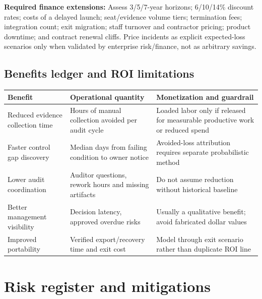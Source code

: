 \documentclass[10pt,letterpaper]{article}
\begin{document}
\textbf{Required finance extensions:} Assess 3/5/7-year horizons; 6/10/14\% discount rates; costs of a delayed launch; seat/evidence volume tiers; termination fees; integration count; exit migration; staff turnover and contractor pricing; product downtime; and contract renewal cliffs. Price incidents as explicit expected-loss scenarios only when validated by enterprise risk/finance, not as arbitrary savings.

\subsection{Benefits ledger and ROI limitations}

\begin{tabularx}{\linewidth}{@{}L{1.45in}L{2.47in}Y@{}}
\toprule
\textbf{Benefit} & \textbf{Operational quantity} & \textbf{Monetization and guardrail}\\\midrule
Reduced evidence collection time & Hours of manual collection avoided per audit cycle & Loaded labor only if released for measurable productive work or reduced spend\\
Faster control gap discovery & Median days from failing condition to owner notice & Avoided-loss attribution requires separate probabilistic method\\
Lower audit coordination & Auditor questions, rework hours and missing artifacts & Do not assume reduction without historical baseline\\
Better management visibility & Decision latency, approved overdue risks & Usually a qualitative benefit; avoid fabricated dollar values\\
Improved portability & Verified export/recovery time and exit cost & Model through exit scenario rather than duplicate ROI line\\
\bottomrule
\end{tabularx}

\section{Risk register and mitigations}
\small
\end{document}
